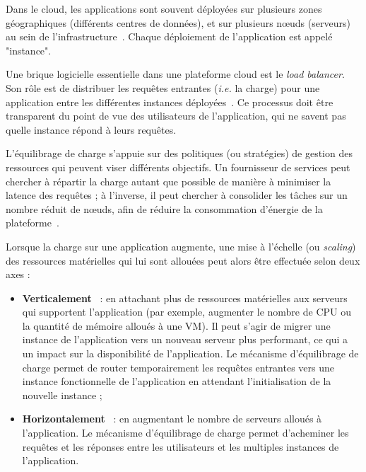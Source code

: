 Dans le cloud, les applications sont souvent déployées sur plusieurs zones géographiques (différents centres de données), et sur plusieurs nœuds (serveurs) au sein de l'infrastructure~\cite{hayesCloudComputing2008}. Chaque déploiement de l'application est appelé "instance".

Une brique logicielle essentielle dans une plateforme cloud est le \textit{load balancer}. Son rôle est de distribuer les requêtes entrantes (\textit{i.e.} la charge) pour une application entre les différentes instances déployées~\cite{jafarnejadghomiLoadbalancingAlgorithmsCloud2017}. Ce processus doit être transparent du point de vue des utilisateurs de l'application, qui ne savent pas quelle instance répond à leurs requêtes.

L'équilibrage de charge s'appuie sur des politiques (ou stratégies) de gestion des ressources qui peuvent viser différents objectifs. Un fournisseur de services peut chercher à répartir la charge autant que possible de manière à minimiser la latence des requêtes ; à l'inverse, il peut chercher à consolider les tâches sur un nombre réduit de nœuds, afin de réduire la consommation d'énergie de la plateforme~\cite{leeEnergyEfficientUtilization2012}.

Lorsque la charge sur une application augmente, une mise à l'échelle (ou \textit{scaling}) des ressources matérielles qui lui sont allouées peut alors être effectuée selon deux axes :

\begin{itemize}
    \item \textbf{Verticalement}~\cite{boyd-wickizerAnalysisLinuxScalability, linderOracleParallelRDBMS1993, xian-hesunScalabilityParallelAlgorithmmachine1994} : en attachant plus de ressources matérielles aux serveurs qui supportent l'application (par exemple, augmenter le nombre de CPU ou la quantité de mémoire alloués à une VM). Il peut s'agir de migrer une instance de l'application vers un nouveau serveur plus performant, ce qui a un impact sur la disponibilité de l'application. Le mécanisme d'équilibrage de charge permet de router temporairement les requêtes entrantes vers une instance fonctionnelle de l'application en attendant l'initialisation de la nouvelle instance ;
    \item \textbf{Horizontalement}~\cite{al-faresHederaDynamicFlow, lakshmanCassandraDecentralizedStructured2010, weilCephScalableHighPerformance} : en augmentant le nombre de serveurs alloués à l'application. Le mécanisme d'équilibrage de charge permet d'acheminer les requêtes et les réponses entre les utilisateurs et les multiples instances de l'application.
\end{itemize}

